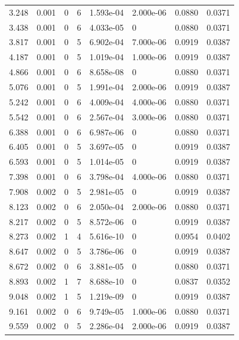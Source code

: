 \documentclass[preview]{standalone}
\begin{document}
{{\begin{tabular}{L{1.2cm}C{1.2cm} C{0.3cm}C{0.5cm} C{1.4cm}C{1.4cm} C{1.4cm}C{1.4cm}}
  3.248  &  0.001  & 0     &  6 &  1.593e-04  & 2.000e-06  & 0.0880 &  0.0371   \\ 
  3.438  &  0.001  & 0     &  6 &  4.033e-05  & 0  & 0.0880 &  0.0371   \\ 
  3.817  &  0.001  & 0     &  5 &  6.902e-04  & 7.000e-06  & 0.0919 &  0.0387   \\ 
  4.187  &  0.001  & 0     &  5 &  1.019e-04  & 1.000e-06  & 0.0919 &  0.0387   \\ 
  4.866  &  0.001  & 0     &  6 &  8.658e-08  & 0  & 0.0880 &  0.0371   \\ 
  5.076  &  0.001  & 0     &  5 &  1.991e-04  & 2.000e-06  & 0.0919 &  0.0387   \\ 
  5.242  &  0.001  & 0     &  6 &  4.009e-04  & 4.000e-06  & 0.0880 &  0.0371   \\ 
  5.542  &  0.001  & 0     &  6 &  2.567e-04  & 3.000e-06  & 0.0880 &  0.0371   \\ 
  6.388  &  0.001  & 0     &  6 &  6.987e-06  & 0  & 0.0880 &  0.0371   \\ 
  6.405  &  0.001  & 0     &  5 &  3.697e-05  & 0  & 0.0919 &  0.0387   \\ 
  6.593  &  0.001  & 0     &  5 &  1.014e-05  & 0  & 0.0919 &  0.0387   \\ 
  7.398  &  0.001  & 0     &  6 &  3.798e-04  & 4.000e-06  & 0.0880 &  0.0371   \\ 
  7.908  &  0.002  & 0     &  5 &  2.981e-05  & 0  & 0.0919 &  0.0387   \\ 
  8.123  &  0.002  & 0     &  6 &  2.050e-04  & 2.000e-06  & 0.0880 &  0.0371   \\ 
  8.217  &  0.002  & 0     &  5 &  8.572e-06  & 0  & 0.0919 &  0.0387   \\ 
  8.273  &  0.002  & 1     &  4 &  5.616e-10  & 0  & 0.0954 &  0.0402   \\ 
  8.647  &  0.002  & 0     &  5 &  3.786e-06  & 0  & 0.0919 &  0.0387   \\ 
  8.672  &  0.002  & 0     &  6 &  3.881e-05  & 0  & 0.0880 &  0.0371   \\ 
  8.893  &  0.002  & 1     &  7 &  8.688e-10  & 0  & 0.0837 &  0.0352   \\ 
  9.048  &  0.002  & 1     &  5 &  1.219e-09  & 0  & 0.0919 &  0.0387   \\ 
  9.161  &  0.002  & 0     &  6 &  9.749e-05  & 1.000e-06  & 0.0880 &  0.0371   \\ 
  9.559  &  0.002  & 0     &  5 &  2.286e-04  & 2.000e-06  & 0.0919 &  0.0387   \\ 

\end{tabular}}}
\end{document}

